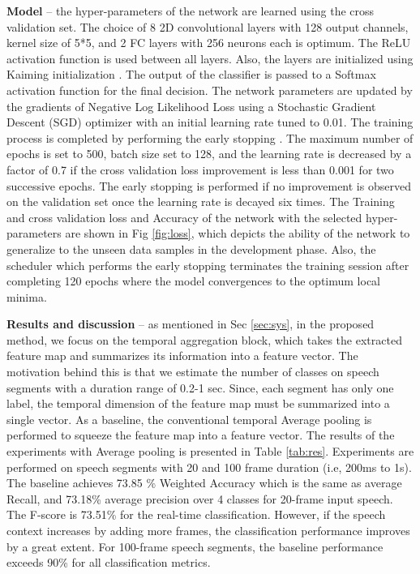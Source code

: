 \documentclass[a4paper]{article}
\begin{document}
\textbf{Model} -- the  hyper-parameters of the network are learned using the cross validation set. The choice of 8 2D convolutional layers with 128 output channels, kernel size of 5*5,  and 2 FC layers with 256 neurons each is optimum. The ReLU activation function is used between all layers. Also, the layers are initialized using Kaiming initialization \cite{he2015delving}. The output of the classifier is passed to a Softmax activation function for the final decision. The  network parameters  are  updated  by  the  gradients  of Negative Log Likelihood Loss using a Stochastic Gradient Descent (SGD) optimizer with an initial learning rate tuned to 0.01. The training process is completed by performing the early stopping \cite{zhang2016understanding}. The maximum number of epochs is set to 500, batch size set to 128, and the learning rate is decreased by a factor of 0.7 if the cross validation loss improvement is less than 0.001 for two successive epochs. The early stopping is performed if no improvement is observed on the validation set once the learning rate is decayed six times. The Training and cross validation loss and Accuracy of the network with the selected hyper-parameters are shown in Fig \ref{fig:loss}, which depicts the ability of the network to generalize to the unseen data samples in the development phase. Also, the scheduler which performs the early stopping terminates the training session after completing 120 epochs where the model convergences to the optimum local minima.



\textbf{Results and discussion} -- as mentioned in Sec \ref{sec:sys}, in the proposed method, we focus on the temporal aggregation block, which takes the extracted feature map and summarizes its information into a feature vector. The motivation behind this is that we estimate the number of classes on speech segments with a duration range of 0.2-1 sec.  Since, each segment has only one label, the temporal dimension of the feature map must be summarized into a single vector. As a baseline, the conventional temporal Average pooling is performed to squeeze the feature map into a feature vector. The results of the experiments with Average pooling is presented in Table \ref{tab:res}. Experiments are performed on speech segments with 20 and 100 frame duration (i.e, 200ms to 1s). The baseline achieves  73.85 \% Weighted Accuracy which is the same as average Recall, and 73.18\% average precision over 4 classes for 20-frame input speech. The F-score is 73.51\% for the real-time classification. However, if the speech context increases by adding more frames, the classification performance improves by a great extent. For 100-frame speech segments, the baseline  performance exceeds 90\% for all classification metrics. 
\end{document}
